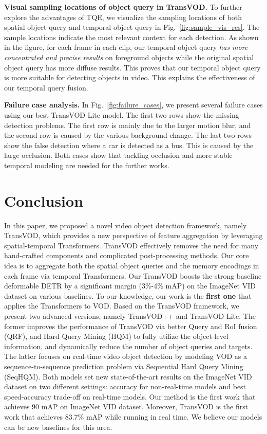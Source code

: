 \documentclass[10pt,journal,compsoc]{IEEEtran}
\begin{document}
\noindent \textbf{Visual sampling locations of object query in TransVOD.} To further explore the advantages of TQE, we visualize the sampling locations of both spatial object query and temporal object query in Fig.~\ref{fig:sample_vis_res}. The sample locations indicate the most relevant context for each detection. As shown in the figure, for each frame in each clip, our temporal object query \textit{has more concentrated and precise results} on foreground objects while the original spatial object query has more diffuse results. This proves that our temporal object query is more suitable for detecting objects in video. This explains the effectiveness of our temporal query fusion.



\noindent \textbf{Failure case analysis.}
In Fig.~\ref{fig:failure_cases}, we present several failure cases using our best TransVOD Lite model. The first two rows show the missing detection problems. The first row is mainly due to the larger motion blur, and the second row is caused by the various background change. The last two rows show the false detection where a car is detected as a bus. This is caused by the large occlusion. Both cases show that tackling occlusion and more stable temporal modeling are needed for the further works.

\section{Conclusion}
In this paper, we proposed a novel video object detection framework, namely TransVOD, which provides a new perspective of feature aggregation by leveraging spatial-temporal Transformers. TransVOD effectively removes the need for many hand-crafted components and complicated post-processing methods. Our core idea is to aggregate both the spatial object queries and the memory encodings in each frame via temporal Transformers. Our TransVOD boosts the strong baseline deformable DETR by a significant margin (3\%-4\% mAP) on the ImageNet VID dataset on various baselines. To our knowledge, our work is the \textbf{first one} that applies the Transformers to VOD. Based on the TransVOD framework, we present two advanced versions, namely TransVOD++ and TransVOD Lite. The former improves the performance of TransVOD via better Query and RoI fusion (QRF), and Hard Query Mining (HQM) to fully utilize the object-level information, and dynamically reduce the number of object queries and targets. The latter focuses on real-time video object detection by modeling VOD as a sequence-to-sequence prediction problem via Sequential Hard Query Mining (SeqHQM). Both models set new state-of-the-art results on the ImageNet VID dataset on two different settings: accuracy for non-real-time models and best speed-accuracy trade-off on real-time models. Our method is the first work that achieves 90 mAP on ImageNet VID dataset. Moreover, TransVOD is the first work that achieves 83.7\% mAP while running in real time. We believe our models can be new baselines for this area. 
\end{document}
